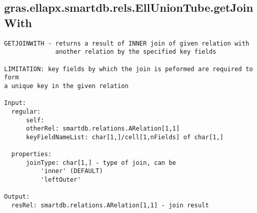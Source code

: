 \subsection{\texorpdfstring{gras.ellapx.smartdb.rels.EllUnionTube.getJoinWith}{getJoinWith}}\label{method:gras.ellapx.smartdb.rels.EllUnionTube.getJoinWith}
\begin{verbatim}
GETJOINWITH - returns a result of INNER join of given relation with
              another relation by the specified key fields

LIMITATION: key fields by which the join is peformed are required to form
a unique key in the given relation

Input:
  regular:
      self:
      otherRel: smartdb.relations.ARelation[1,1]
      keyFieldNameList: char[1,]/cell[1,nFields] of char[1,]

  properties:
      joinType: char[1,] - type of join, can be
          'inner' (DEFAULT)
          'leftOuter'

Output:
  resRel: smartdb.relations.ARelation[1,1] - join result
\end{verbatim}
